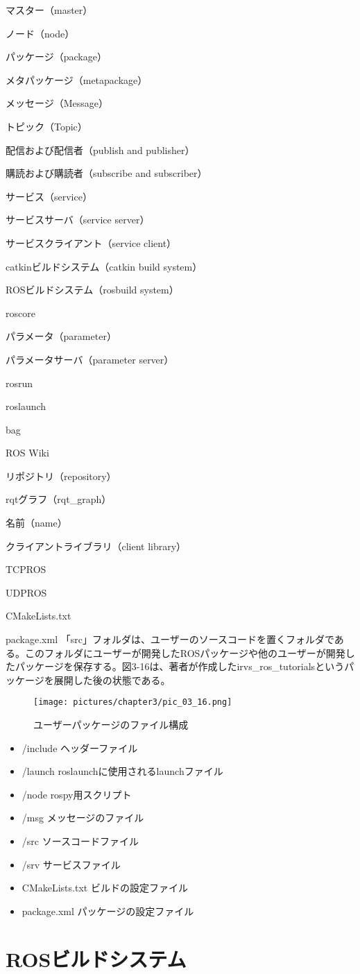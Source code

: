 \begin{term}{マスター（master）}
\begin{term}{ノード（node）}
\begin{term}{パッケージ（package）}
\begin{term}{メタパッケージ（metapackage）}
\begin{term}{メッセージ（Message）}
\begin{term}{トピック（Topic）}
\begin{term}{配信および配信者（publish and publisher）}
\begin{term}{購読および購読者（subscribe and subscriber）}
\begin{term}{サービス（service）}
\begin{term}{サービスサーバ（service server）}
\begin{term}{サービスクライアント（service client）}
\begin{term}{catkinビルドシステム（catkin build system）}
\begin{term}{ROSビルドシステム（rosbuild system）}
\begin{term}{roscore}
\begin{term}{パラメータ（parameter）}
\begin{term}{パラメータサーバ（parameter server）}
\begin{term}{rosrun}
\begin{term}{roslaunch}
\begin{term}{bag}
\begin{term}{ROS Wiki}
\begin{term}{リポジトリ（repository）}
\begin{term}{rqtグラフ（rqt\_graph）}
\begin{term}{名前（name）}
\begin{term}{クライアントライブラリ（client library）}
\begin{term}{TCPROS}
\begin{term}{UDPROS}
\begin{term}{CMakeLists.txt}
\begin{term}{package.xml}
「src」フォルダは、ユーザーのソースコードを置くフォルダである。このフォルダにユーザーが開発したROSパッケージや他のユーザーが開発したパッケージを保存する。図3-16は、著者が作成したirvs\_ros\_tutorialsというパッケージを展開した後の状態である。

\begin{figure}[h]
  \centering
  \texttt{[image: pictures/chapter3/pic\_03\_16.png]}
  \caption{ユーザーパッケージのファイル構成}
\end{figure}

\vspace{\baselineskip}
\begin{itemize}
\item /include    ヘッダーファイル
\item /launch   roslaunchに使用されるlaunchファイル
\item /node     rospy用スクリプト
\item /msg      メッセージのファイル
\item /src      ソースコードファイル
\item /srv      サービスファイル
\item CMakeLists.txt  ビルドの設定ファイル
\item package.xml   パッケージの設定ファイル
\end{itemize}
\vspace{\baselineskip}

\section{ROSビルドシステム}


\end{term}
\end{term}
\end{term}
\end{term}
\end{term}
\end{term}
\end{term}
\end{term}
\end{term}
\end{term}
\end{term}
\end{term}
\end{term}
\end{term}
\end{term}
\end{term}
\end{term}
\end{term}
\end{term}
\end{term}
\end{term}
\end{term}
\end{term}
\end{term}
\end{term}
\end{term}
\end{term}
\end{term}
